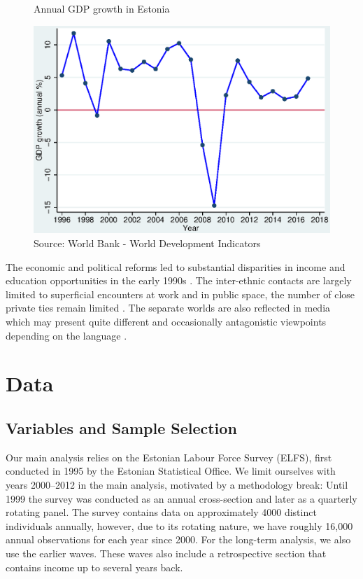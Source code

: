 \documentclass[12pt, a4paper]{article}
\begin{document}
\begin{figure}[h]
 \centering           
 \caption{Annual GDP growth in Estonia}\label{fig:gdp_growth}
 \includegraphics[width=0.6\linewidth]{Figure1.eps}
 \caption*{Source: World Bank - World Development Indicators}
\end{figure}

The economic and political reforms led to substantial
disparities in income and education opportunities
in the early 1990s \citep{Leping2008,
	lindemann+saar2011Russian2ndGeneration}. The inter-ethnic contacts
are largely limited to superficial encounters at work and in public
space, the number of close private ties remain limited
\citep{korts2009JofBaltStud}. The
separate worlds are also reflected in media which may present quite
different and occasionally antagonistic viewpoints depending on the
language \citep{Korts2002}.


\section{Data}
\label{subsec:ss_var}

\subsection{Variables and Sample Selection}
\label{sec:variables}

Our main analysis relies on the Estonian Labour Force Survey (ELFS),
first conducted in 1995 by the Estonian Statistical Office. We limit
ourselves with years 2000--2012 in the main analysis, motivated by a
methodology break: Until 1999 the survey was conducted as an annual
cross-section and later as a quarterly rotating panel. The survey
contains data on approximately 4000 distinct individuals annually,
however, due to its rotating nature, we have roughly 16,000 annual
observations for each year since 2000. For the long-term analysis, we
also use the earlier waves. These waves also include a retrospective
section that contains income up to several years back.
\end{document}
